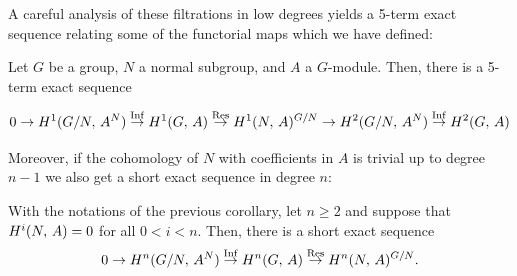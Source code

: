 \documentclass[a4paper, oneside]{memoir}
\begin{document}
A careful analysis of these filtrations in low degrees yields a 5-term exact sequence relating some of the functorial maps which we have defined:

\begin{corollary}\label{cor:LowDegree}
	Let $G$ be a group, $N$ a normal subgroup, and $A$ a $G$-module. Then, there is a 5-term exact sequence

	\[
		0\to H^{1}( G / N, \, A^N )\overset{\operatorname{Inf}}{\to} H^{1}( G, \, A )\overset{\operatorname{Res}}{\to} H^{1}( N, \, A )^{G /N} \to H^{2}( G /N, \, A^N )\overset{\operatorname{Inf}}{\to} H^{2}( G, \, A )
	\]

\end{corollary}

Moreover, if the cohomology of $N$ with coefficients in $A$ is trivial up to degree $n-1$ we also get a short exact sequence in degree $n$:

\begin{corollary}\label{cor:InfRes}
	With the notations of the previous corollary, let $n\geq 2$ and suppose that $H^{i}( N, \, A )=0$ for all $0 < i < n$.
	Then, there is a short exact sequence
	\[
		0\to H^{n}( G / N, \, A^N )\overset{\operatorname{Inf}}{\to} H^{n}( G, \, A )\overset{\operatorname{Res}}{\to} H^{n}( N, \, A )^{G /N}.
	\]
\end{corollary}
\end{document}
